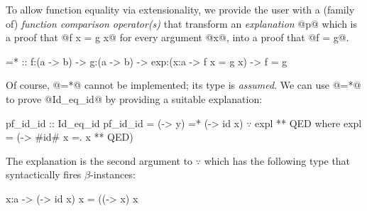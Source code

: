 \newcommand\eqfun{\ensuremath{\texttt{=}\forall}}

%
To allow function equality via
extensionality, we provide the
user with a (family of)
%
\emph{function comparison operator(s)}
that transform an \emph{explanation} @p@
which is a proof that @f x = g x@ for every
argument @x@, into a proof that @f = g@.
%
\begin{mcode}
  =* :: f:(a -> b) -> g:(a -> b)
     -> exp:(x:a -> {f x = g x})
     -> {f = g}
\end{mcode}
%
Of course, @=*@ cannot be implemented;
its type is \emph{assumed}. We can use
@=*@ to prove @Id_eq_id@ by providing
a suitable explanation:
%
\begin{mcode}
  pf_id_id :: Id_eq_id
  pf_id_id = (\y -> y) =* (\x -> id x) $\because$ expl ** QED
   where
     expl  = (\x -> #id# x =. x ** QED)
\end{mcode}
%
%
The explanation is
the second argument to $\because$ which has
the following type that syntactically fires $\beta$-instances:
\begin{code}
  x:a -> {(\x -> id x) x = ((\x -> x) x}
\end{code}


